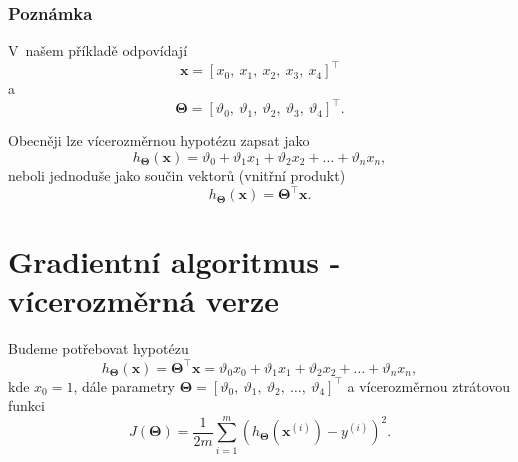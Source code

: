 \subsubsection*{Poznámka}
\par{V~našem příkladě odpovídají
\begin{equation}
	\bm{x} = \left[ x_0,~x_1,~x_2,~x_3,~x_4 \right]^{\top}
\end{equation}
a
\begin{equation}
	\bm{\Theta} = \left[ \vartheta_0,~\vartheta_1,~\vartheta_2,~\vartheta_3,~\vartheta_4 \right]^{\top}.
\end{equation}}

\par{Obecněji lze vícerozměrnou hypotézu zapsat jako
\begin{equation}
	h_{\bm{\Theta}} \left( \bm{x} \right) = \vartheta_0 + \vartheta_1 x_1 + \vartheta_2 x_2 + \ldots + \vartheta_n x_n,
	\label{eq:NDhypothesisObecne}
\end{equation}
neboli jednoduše jako součin vektorů (vnitřní produkt)
\begin{equation}
	h_{\bm{\Theta}} \left( \bm{x} \right) = \bm{\Theta}^{\top} \bm{x}.
	\label{eq:NDhypothesisObecneVektorove}
\end{equation}}


\newpage












\section{Gradientní algoritmus - vícerozměrná verze}
\label{sec:LinearniRegreseGradientDescentVicerozmerny}

\par{Budeme potřebovat hypotézu
\begin{equation}
	h_{\bm{\Theta}} \left( \bm{x} \right) = \bm{\Theta}^{\top} \bm{x} = \vartheta_0 x_0 + \vartheta_1 x_1 + \vartheta_2 x_2 + \ldots + \vartheta_n x_n,
\end{equation}
kde $x_0 = 1$, dále parametry $\bm{\Theta} = \left[ \vartheta_0,~\vartheta_1,~\vartheta_2,~\ldots,~\vartheta_4 \right]^{\top}$ a vícerozměrnou ztrátovou funkci
\begin{equation}
	J \left( \bm{\Theta} \right) = \frac{1}{2m} \sum_{i = 1}^{m} \left( h_{\bm{\Theta}} \left( \bm{x}^{\left( i \right)} \right) - y^{\left( i \right)} \right)^2.
\end{equation}}

